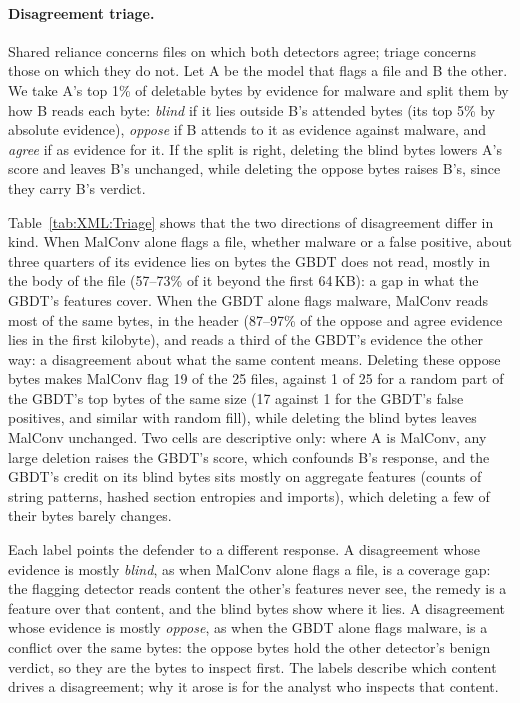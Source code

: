 \paragraph{Disagreement triage.} Shared reliance concerns files on which both detectors agree; triage concerns those on
which they do not. Let A be the model that flags a file and B the other. We take A's top 1\% of deletable bytes by
evidence for malware and split them by how B reads each byte: \emph{blind} if it lies outside B's attended bytes (its
top 5\% by absolute evidence), \emph{oppose} if B attends to it as evidence against malware, and \emph{agree} if as
evidence for it. If the split is right, deleting the blind bytes lowers A's score and leaves B's unchanged, while
deleting the oppose bytes raises B's, since they carry B's verdict.

Table~\ref{tab:XML:Triage} shows that the two directions of disagreement differ in kind. When MalConv alone flags a
file, whether malware or a false positive, about three quarters of its evidence lies on bytes the GBDT does not read,
mostly in the body of the file (57--73\% of it beyond the first 64\,KB): a gap in what the GBDT's features cover. When
the GBDT alone flags malware, MalConv reads most of the same bytes, in the header (87--97\% of the oppose and agree
evidence lies in the first kilobyte), and reads a third of the GBDT's evidence the other way: a disagreement about what
the same content means. Deleting these oppose bytes makes MalConv flag 19 of the 25 files, against 1 of 25 for a random
part of the GBDT's top bytes of the same size (17 against 1 for the GBDT's false positives, and similar with random
fill), while deleting the blind bytes leaves MalConv unchanged. Two cells are descriptive only: where A is MalConv, any
large deletion raises the GBDT's score, which confounds B's response, and the GBDT's credit on its blind bytes sits
mostly on aggregate features (counts of string patterns, hashed section entropies and imports), which deleting a few of
their bytes barely changes.

Each label points the defender to a different response. A disagreement whose evidence is mostly \emph{blind}, as when
MalConv alone flags a file, is a coverage gap: the flagging detector reads content the other's features never see, the
remedy is a feature over that content, and the blind bytes show where it lies. A disagreement whose evidence is mostly
\emph{oppose}, as when the GBDT alone flags malware, is a conflict over the same bytes: the oppose bytes hold the other
detector's benign verdict, so they are the bytes to inspect first. The labels describe which content drives a disagreement; why it
arose is for the analyst who inspects that content.

